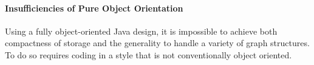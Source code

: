 \paragraph{Insufficiencies of Pure Object Orientation}
Using a fully object-oriented Java design, it is impossible to achieve both
compactness of storage and the generality to handle a variety of graph
structures. To do so requires coding in a style that is not conventionally object
oriented.

